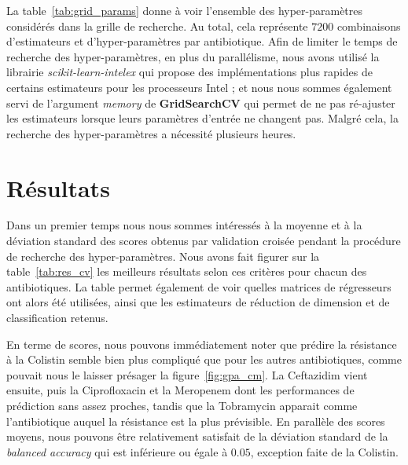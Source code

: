 \documentclass[11pt]{article}
\begin{document}
  La table~\ref{tab:grid_params} donne à voir l'ensemble des hyper-paramètres considérés dans la grille de recherche.
  Au total, cela représente $7200$ combinaisons d'estimateurs et d'hyper-paramètres par antibiotique.
  Afin de limiter le temps de recherche des hyper-paramètres, en plus du parallélisme, nous avons utilisé la librairie \textit{scikit-learn-intelex} qui propose des implémentations plus rapides de certains estimateurs pour les processeurs Intel ;
  et nous nous sommes également servi de l'argument \textit{memory} de \textbf{GridSearchCV} qui permet de ne pas ré-ajuster les estimateurs lorsque leurs paramètres d'entrée ne changent pas.
  Malgré cela, la recherche des hyper-paramètres a nécessité plusieurs heures.

\hypertarget{resultats}{%
\section{Résultats}\label{resultats}}

  Dans un premier temps nous nous sommes intéressés à la moyenne et à la déviation standard des scores obtenus par validation croisée pendant la procédure de recherche des hyper-paramètres.
  Nous avons fait figurer sur la table~\ref{tab:res_cv} les meilleurs résultats selon ces critères pour chacun des antibiotiques.
  La table permet également de voir quelles matrices de régresseurs ont alors été utilisées, ainsi que les estimateurs de réduction de dimension et de classification retenus.

  

  En terme de scores, nous pouvons immédiatement noter que prédire la résistance à la Colistin semble bien plus compliqué que pour les autres antibiotiques, comme pouvait nous le laisser présager la figure~\ref{fig:gpa_cm}.
  La Ceftazidim vient ensuite, puis la Ciprofloxacin et la Meropenem dont les performances de prédiction sans assez proches, tandis que la Tobramycin apparait comme l'antibiotique auquel la résistance est la plus prévisible.
  En parallèle des scores moyens, nous pouvons être relativement satisfait de la déviation standard de la \textit{balanced accuracy} qui est inférieure ou égale à $0.05$, exception faite de la Colistin.
\end{document}
